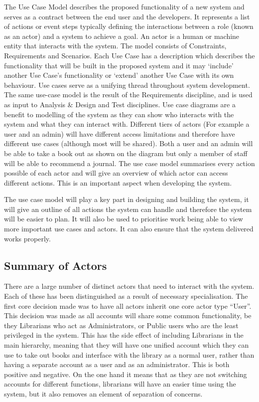 The Use Case Model describes the proposed functionality of a new system and serves as a contract between the end user and the developers. It represents a list of actions or event steps typically defining the interactions between a role (known as an actor) and a system to achieve a goal. An actor is a human or machine entity that interacts with the system. The model consists of Constraints, Requirements and Scenarios. Each Use Case has a description which describes the functionality that will be built in the proposed system and it may `include' another Use Case's functionality or `extend' another Use Case with its own behaviour\cite{umlusecase}. Use cases serve as a unifying thread throughout system development. The same use-case model is the result of the Requirements discipline, and is used as input to Analysis \& Design and Test disciplines. Use case diagrams are a benefit to modelling of the system as they can show who interacts with the system and what they can interact with. Different tiers of actors (For example a user and an admin) will have different access limitations and therefore have different use cases (although most will be shared). Both a user and an admin will be able to take a book out as shown on the diagram but only a member of staff will be able to recommend a journal. The use case model summarises every action possible of each actor and will give an overview of which actor can access different actions. This is an important aspect when developing the system\cite{eclipseusecase}.

The use case model will play a key part in designing and building the system, it will give an outline of all actions the system can handle and therefore the system will be easier to plan. It will also be used to prioritise work being able to view more important use cases and actors. It can also ensure that the system delivered works properly\cite{alhirusecase}.

\subsection{Summary of Actors}

There are a large number of distinct actors that need to interact with the system. Each of these has been distinguished as a result of necessary specialisation. The first core decision made was to have all actors inherit one core actor type ``User''. This decision was made as all accounts will share some common functionality, be they Librarians who act as Administrators, or Public users who are the least privileged in the system. This has the side effect of including Librarians in the main hierarchy, meaning that they will have one unified account which they can use to take out books and interface with the library as a normal user, rather than having a separate account as a user and as an administrator. This is both positive and negative. On the one hand it means that as they are not switching accounts for different functions, librarians will have an easier time using the system, but it also removes an element of separation of concerns.

